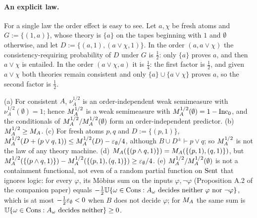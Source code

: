 \paragraph{An explicit law.} For a single law the order effect is easy to see. Let $a,\chi$ be fresh atoms and $G:=\{(1,a)\}$, whose theory is $\{a\}$ on the tapes beginning with $1$ and $\emptyset$ otherwise, and let $D:=\{(a,1),(a\vee\chi,1)\}$. In the order $(a,a\vee\chi)$ the consistency-requiring probability of $D$ under $G$ is $\frac12$: only $\{a\}$ proves $a$, and then $a\vee\chi$ is entailed. In the order $(a\vee\chi,a)$ it is $\frac14$: the first factor is $\frac12$, and given $a\vee\chi$ both theories remain consistent and only $\{a\}\cup\{a\vee\chi\}$ proves $a$, so the second factor is $\frac12$.

\begin{proposition}\label{prop:basic:graded}
(a) For consistent $A$, $\nu^{1/2}_A$ is an order-independent weak semimeasure with $\nu^{1/2}_A(\emptyset)=1$; hence $M_{A}^{1/2}$ is a weak semimeasure with $M_{A}^{1/2}(\emptyset)=1-\mathrm{Inc}_0$, and the conditionals of $M_{A}^{1/2}/M_{A}^{1/2}(\emptyset)$ form an order-independent predictor. (b) $M_{A}^{1/2}\ge M_{A}$. (c) For fresh atoms $p,q$ and $D:=\{(p,1)\}$, $M_{A}^{1/2}(D+(p\vee q,1))\le M_{A}^{1/2}(D)-\varepsilon_{\emptyset}/4$, although $B\cup D^\pm\vdash p\vee q$; so $M_{A}^{1/2}$ is not the law of any theory machine. (d) $M_{A}(\{(p\wedge q,1)\})=M_{A}(\{(p,1),(q,1)\})$, but $M_{A}^{1/2}(\{(p\wedge q,1)\})-M_{A}^{1/2}(\{(p,1),(q,1)\})\ge\varepsilon_{\emptyset}/4$. (e) $M_{A}^{1/2}/M_{A}^{1/2}(\emptyset)$ is not a containment functional, not even of a random partial function on $\mathrm{Sent}$ that ignores logic: for every $\varphi$, its Möbius sum on the inputs $\varphi,\neg\varphi$ (Proposition A.2 of the companion paper) equals $-\frac12\mathbb{U}\{\omega\in\mathrm{Cons}:A_\omega\text{ decides neither }\varphi\text{ nor }\neg\varphi\}$, which is at most $-\frac12\varepsilon_{\emptyset}<0$ when $B$ does not decide $\varphi$; for $M_{A}$ the same sum is $\mathbb{U}\{\omega\in\mathrm{Cons}:A_\omega\text{ decides neither}\}\ge0$.
\end{proposition}

